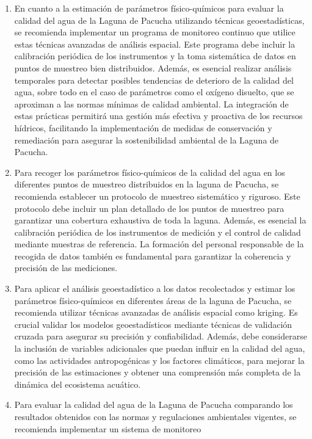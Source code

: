 \begin{enumerate}
    \item En cuanto a la estimación de parámetros físico-químicos para evaluar la calidad del agua de la Laguna de Pacucha utilizando técnicas geoestadísticas, se recomienda implementar un programa de monitoreo continuo que utilice estas técnicas avanzadas de análisis espacial. Este programa debe incluir la calibración periódica de los instrumentos y la toma sistemática de datos en puntos de muestreo bien distribuidos. Además, es esencial realizar análisis temporales para detectar posibles tendencias de deterioro de la calidad del agua, sobre todo en el caso de parámetros como el oxígeno disuelto, que se aproximan a las normas mínimas de calidad ambiental. La integración de estas prácticas permitirá una gestión más efectiva y proactiva de los recursos hídricos, facilitando la implementación de medidas de conservación y remediación para asegurar la sostenibilidad ambiental de la Laguna de Pacucha.
    \item Para recoger los parámetros físico-químicos de la calidad del agua en los diferentes puntos de muestreo distribuidos en la laguna de Pacucha, se recomienda establecer un protocolo de muestreo sistemático y riguroso. Este protocolo debe incluir un plan detallado de los puntos de muestreo para garantizar una cobertura exhaustiva de toda la laguna. Además, es esencial la calibración periódica de los instrumentos de medición y el control de calidad mediante muestras de referencia. La formación del personal responsable de la recogida de datos también es fundamental para garantizar la coherencia y precisión de las mediciones.
    \item Para aplicar el análisis geoestadístico a los datos recolectados y estimar los parámetros físico-químicos en diferentes áreas de la laguna de Pacucha, se recomienda utilizar técnicas avanzadas de análisis espacial como kriging. Es crucial validar los modelos geoestadísticos mediante técnicas de validación cruzada para asegurar su precisión y confiabilidad. Además, debe considerarse la inclusión de variables adicionales que puedan influir en la calidad del agua, como las actividades antropogénicas y los factores climáticos, para mejorar la precisión de las estimaciones y obtener una comprensión más completa de la dinámica del ecosistema acuático.
    \item Para evaluar la calidad del agua de la Laguna de Pacucha comparando los resultados obtenidos con las normas y regulaciones ambientales vigentes, se recomienda implementar un sistema de monitoreo
    \end{enumerate}